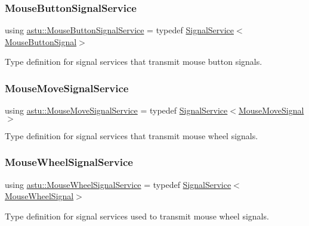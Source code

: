 \subsubsection{\texorpdfstring{Mouse\+Button\+Signal\+Service}{MouseButtonSignalService}}
{\footnotesize\ttfamily using \hyperlink{group__input__group_gaef177cf232be6c7241aa5666eda79fe2}{astu\+::\+Mouse\+Button\+Signal\+Service} = typedef \hyperlink{classastu_1_1SignalService}{Signal\+Service}$<$\hyperlink{classastu_1_1MouseButtonSignal}{Mouse\+Button\+Signal}$>$}

Type definition for signal services that transmit mouse button signals. \mbox{\label{group__input__group_ga030aa8acde5d1cbd13faeb15e487adaf}} 
\subsubsection{\texorpdfstring{Mouse\+Move\+Signal\+Service}{MouseMoveSignalService}}
{\footnotesize\ttfamily using \hyperlink{group__input__group_ga030aa8acde5d1cbd13faeb15e487adaf}{astu\+::\+Mouse\+Move\+Signal\+Service} = typedef \hyperlink{classastu_1_1SignalService}{Signal\+Service}$<$\hyperlink{classastu_1_1MouseMoveSignal}{Mouse\+Move\+Signal}$>$}

Type definition for signal services that transmit mouse wheel signals. \mbox{\label{group__input__group_ga96b8db1f382f5583478ba36333545c44}} 
\subsubsection{\texorpdfstring{Mouse\+Wheel\+Signal\+Service}{MouseWheelSignalService}}
{\footnotesize\ttfamily using \hyperlink{group__input__group_ga96b8db1f382f5583478ba36333545c44}{astu\+::\+Mouse\+Wheel\+Signal\+Service} = typedef \hyperlink{classastu_1_1SignalService}{Signal\+Service}$<$\hyperlink{classastu_1_1MouseWheelSignal}{Mouse\+Wheel\+Signal}$>$}

Type definition for signal services used to transmit mouse wheel signals. \mbox{\label{group__input__group_ga5949d03cd17e1fe53096ce501f2eb408}} 
